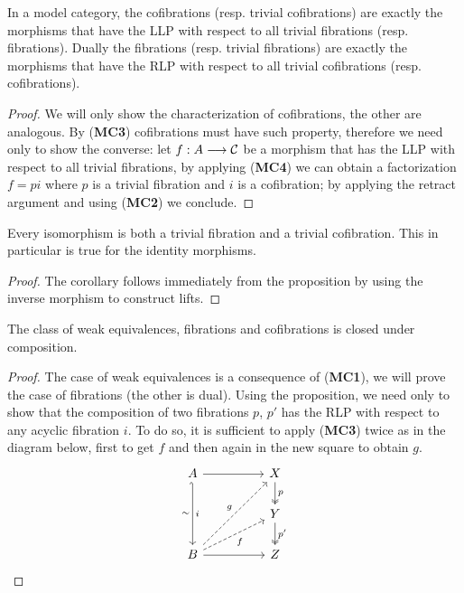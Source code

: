 \begin{proposition}
	\label{prop:LLP-RLP}
	In a model category, the cofibrations (resp. trivial cofibrations) are exactly the morphisms that have the LLP with respect to all trivial fibrations (resp. fibrations). Dually the fibrations (resp. trivial fibrations) are exactly the morphisms that have the RLP with respect to all trivial cofibrations (resp. cofibrations).
\end{proposition}
\begin{proof}
	We will only show the characterization of cofibrations, the other are analogous. By (\textbf{MC3}) cofibrations must have such property, therefore we need only to show the converse: let $f: A\longrightarrow \mathcal{C}$ be a morphism that has the LLP with respect to all trivial fibrations, by applying (\textbf{MC4}) we can obtain a factorization $f=pi$ where $p$ is a trivial fibration and $i$ is a cofibration; by applying the retract argument and using (\textbf{MC2}) we conclude.
\end{proof}

\begin{corollary}
	Every isomorphism is both a trivial fibration and a trivial cofibration. This in particular is true for the identity morphisms.
\end{corollary}
\begin{proof}
	The corollary follows immediately from the proposition by using the inverse morphism to construct lifts.
\end{proof}

\begin{corollary}
	\label{cor:closed-comp}
	The class of weak equivalences, fibrations and cofibrations is closed under composition.
\end{corollary}
\begin{proof}
	The case of weak equivalences is a consequence of (\textbf{MC1}), we will prove the case of fibrations (the other is dual).
	Using the proposition, we need only to show that the composition of two fibrations $p$, $p'$ has the RLP with respect to any acyclic fibration $i$. To do so, it is sufficient to apply (\textbf{MC3}) twice as in the diagram below, first to get $f$ and then again in the new square to obtain $g$.
	\[\begin{tikzcd}
		A && X \\
		&& Y \\
		B && Z
		\arrow[from=1-1, to=1-3]
		\arrow["i", "\sim"', hook', from=1-1, to=3-1]
		\arrow["p", two heads, from=1-3, to=2-3]
		\arrow["{p'}", two heads, from=2-3, to=3-3]
		\arrow["g", dashed, from=3-1, to=1-3]
		\arrow["f"', dashed, from=3-1, to=2-3]
		\arrow[from=3-1, to=3-3]
	\end{tikzcd}\]
\end{proof}

